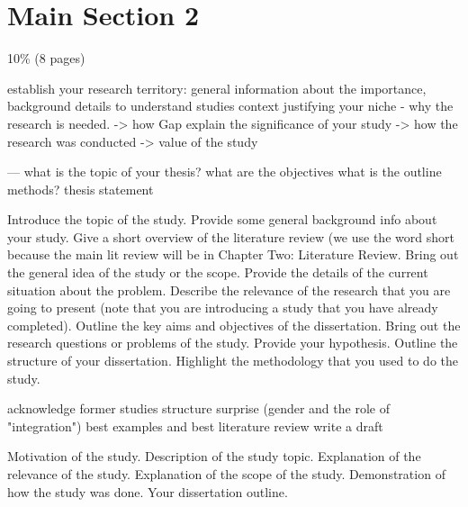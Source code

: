 \section{Main Section 2}

10\% (8 pages)

establish your research territory: general information about the importance, background details to understand studies context
justifying your niche - why the research is needed. -> how Gap
explain the significance of your study -> how the research was conducted -> value of the study

---
what is the topic of your thesis?
what are the objectives
what is the outline
methods?
thesis statement

Introduce the topic of the study.
Provide some general background info about your study.
Give a short overview of the literature review (we use the word short because the main lit review will be in Chapter Two: Literature Review.
Bring out the general idea of the study or the scope.
Provide the details of the current situation about the problem.
Describe the relevance of the research that you are going to present (note that you are introducing a study that you have already completed).
Outline the key aims and objectives of the dissertation.
Bring out the research questions or problems of the study.
Provide your hypothesis.
Outline the structure of your dissertation.
Highlight the methodology that you used to do the study.


acknowledge former studies
structure 
surprise (gender and the role of "integration")
best examples and best literature review
write a draft

Motivation of the study.
Description of the study topic.
Explanation of the relevance of the study.
Explanation of the scope of the study.
Demonstration of how the study was done.
Your dissertation outline.
